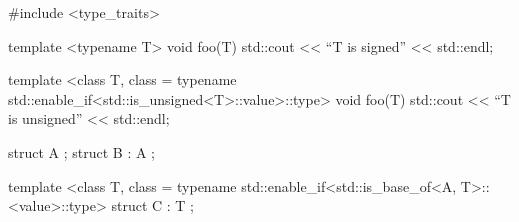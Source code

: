 \documentclass{amsbook}
\begin{document}
\begin{cpp}

  #include <type_traits>

  template <typename T>
  void foo(T) {
    std::cout << ``T is signed'' << std::endl;
  }

  template <class T, class = typename std::enable_if<std::is_unsigned<T>::value>::type>
  void foo(T) {
    std::cout << ``T is unsigned'' << std::endl;
  }

  struct A {};
  struct B : A {};

  template <class T, class = typename std::enable_if<std::is_base_of<A, T>::<value>::type>
  struct C : T {};
    
\end{cpp}
\end{document}
